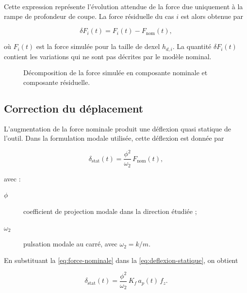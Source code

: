 \documentclass[
    11pt,
    a4paper
]{article}
\begin{document}
Cette expression représente l'évolution attendue de la force due uniquement à
la rampe de profondeur de coupe. La force résiduelle du cas \(i\) est alors
obtenue par

\begin{equation}
    \delta F_i(t)
    =
    F_i(t)-F_{\mathrm{nom}}(t),
    \label{eq:force-residuelle}
\end{equation}

où \(F_i(t)\) est la force simulée pour la taille de dexel \(h_{d,i}\).
La quantité \(\delta F_i(t)\) contient les variations qui ne sont pas décrites
par le modèle nominal.

\begin{figure}[H]
    \centering
    \caption{Décomposition de la force simulée en composante nominale et composante résiduelle.}
    \label{fig:force-residuelle}
\end{figure}

\subsection{Correction du déplacement}
\label{subsec:correction-deplacement}

L'augmentation de la force nominale produit une déflexion quasi statique de
l'outil. Dans la formulation modale utilisée, cette déflexion est donnée par

\begin{equation}
    \delta_{\mathrm{stat}}(t)
    =
    \frac{\phi^{2}}{\omega_2}\,
    F_{\mathrm{nom}}(t),
    \label{eq:deflexion-statique}
\end{equation}

avec :

\begin{description}
    \item[\(\phi\)] coefficient de projection modale dans la direction étudiée ;
    \item[\(\omega_2\)] pulsation modale au carré, avec
    \(\omega_2=k/m\).
\end{description}

En substituant la \ref{eq:force-nominale} dans la
\ref{eq:deflexion-statique}, on obtient

\begin{equation}
    \delta_{\mathrm{stat}}(t)
    =
    \frac{\phi^{2}}{\omega_2}\,
    K_f\,a_p(t)\,f_z.
    \label{eq:deflexion-statique-developpee}
\end{equation}
\end{document}
